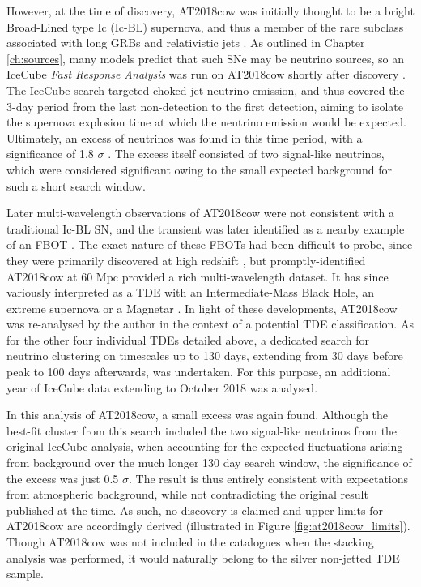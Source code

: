 However, at the time of discovery, AT2018cow was initially thought to be a bright Broad-Lined type Ic (Ic-BL) supernova, and thus a member of the rare subclass associated with long GRBs and relativistic jets . As outlined in Chapter \ref{ch:sources}, many models predict that such SNe may be neutrino sources, so an IceCube \emph{Fast Response Analysis} was run on AT2018cow shortly after discovery . The IceCube search targeted choked-jet neutrino emission, and thus covered the 3-day period from the last non-detection to the first detection, aiming to isolate the supernova explosion time at which the neutrino emission would be expected. Ultimately, an excess of neutrinos was found in this time period, with a significance of 1.8 $\sigma$ . The excess itself consisted of two signal-like neutrinos, which were considered significant owing to the small expected background for such a short search window.

Later multi-wavelength observations of AT2018cow were not consistent with a traditional Ic-BL SN, and the transient was later identified as a nearby example of an FBOT . The exact nature of these FBOTs had been difficult to probe, since they were primarily discovered at high redshift , but promptly-identified AT2018cow at 60 Mpc provided a rich multi-wavelength dataset. It has since variously interpreted as a TDE with an Intermediate-Mass Black Hole, an extreme supernova or a Magnetar . In light of these developments, AT2018cow was re-analysed by the author in the context of a potential TDE classification. As for the other four individual TDEs detailed above, a dedicated search for neutrino clustering on timescales up to 130 days, extending from 30 days before peak to 100 days afterwards, was undertaken.  For this purpose, an additional year of IceCube data extending to October 2018 was analysed.

In this analysis of AT2018cow, a small excess was again found. Although the best-fit cluster from this search included the two signal-like neutrinos from the original IceCube analysis, when accounting for the expected fluctuations arising from background over the much longer 130 day search window, the significance of the excess was just 0.5 $\sigma$. The result is thus entirely consistent with expectations from atmospheric background, while not contradicting the original result published at the time. As such, no discovery is claimed and upper limits for AT2018cow are accordingly derived (illustrated in Figure \ref{fig:at2018cow_limits}). Though AT2018cow was not included in the catalogues when the stacking analysis was performed, it would naturally belong to the silver non-jetted TDE sample. 

